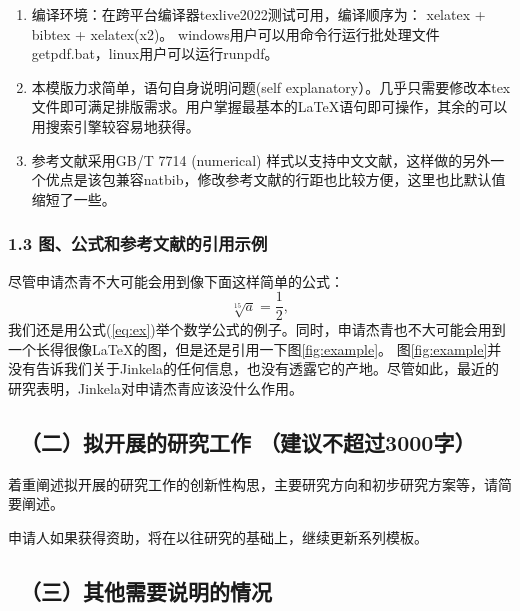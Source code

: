 \documentclass[12pt,UTF8,AutoFakeBold=3,a4paper]{ctexart} %
\newcommand{\sihao}{\fontsize{14.2pt}{\baselineskip}\selectfont}
\begin{document}
\begin{enumerate}
\item 编译环境：在跨平台编译器texlive2022测试可用，编译顺序为： xelatex + bibtex + xelatex(x2)。 windows用户可以用命令行运行批处理文件getpdf.bat，linux用户可以运行runpdf。
\item 本模版力求简单，语句自身说明问题(self explanatory）。几乎只需要修改本tex文件即可满足排版需求。用户掌握最基本的\LaTeX 语句即可操作，其余的可以用搜索引擎较容易地获得。
\item 参考文献采用GB/T 7714 (numerical) 样式以支持中文文献，这样做的另外一个优点是该包兼容natbib，修改参考文献的行距也比较方便，这里也比默认值缩短了一些。
\end{enumerate}

\subsubsection{1.3 图、公式和参考文献的引用示例}
尽管申请杰青不大可能会用到像下面这样简单的公式：
\begin{equation}
\label{eq:ex}
\sqrt[15]{a}=\frac{1}{2},
\end{equation}
我们还是用公式(\ref{eq:ex})举个数学公式的例子。同时，申请杰青也不大可能会用到一个长得很像\LaTeX 的图，但是还是引用一下图\ref{fig:example}。 图\ref{fig:example}并没有告诉我们关于Jinkela\cite{John1997,Smith1900}的任何信息，也没有透露它的产地\cite{Piter1992,grif1998}。尽管如此，最近的研究表明，Jinkela对申请杰青应该没什么作用\cite{John1997}。


%


\newpage

{\color{MsBlue} \subsection{\sihao \kaishu \quad \ （二）拟开展的研究工作 \textnormal{\kaishu （建议不超过3000字） }} }
{\color{MsBlue} \kaishu \sihao 着重阐述拟开展的研究工作的创新性构思，主要研究方向和初步研究方案等，请简要阐述。}

申请人如果获得资助，将在以往研究的基础上，继续更新系列模板。

{\color{MsBlue} \subsection{\sihao \kaishu \quad \ （三）其他需要说明的情况 }}
\end{document}
